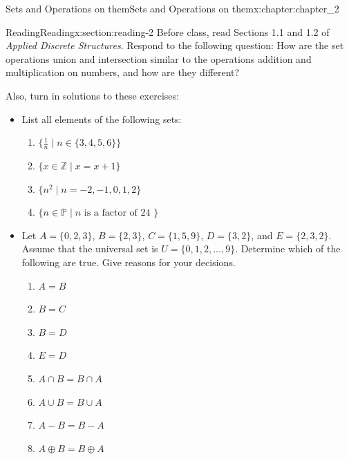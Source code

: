\documentclass[oneside,10pt,]{book}
\numberwithin{equation}{section}
\begin{document}
\typeout{************************************************}
%
\begin{chapterptx}{Sets and Operations on them}{}{Sets and Operations on them}{}{}{x:chapter:chapter_2}
%
%
%
\typeout{************************************************}
\typeout{************************************************}
%
\begin{sectionptx}{Reading}{}{Reading}{}{}{x:section:reading-2}
Before class, read Sections 1.1 and 1.2 of \emph{Applied Discrete Structures}.  Respond to the following question: How are the set operations union and intersection similar to the operations addition and multiplication on numbers, and how are they different?%
\par
Also, turn in solutions to these exercises:%
\begin{itemize}[label=\textbullet]
\item{}List all elements of the following sets:%
\begin{enumerate}[label=(\alph*)]
\item{}\(\{\frac{1}{n} \mid n \in \{3,4,5,6\}\}\)%
\item{}\(\{x \in \mathbb{Z} \mid x = x+1 \}\)%
\item{}\(\{n^2 \mid  n = -2, -1, 0, 1, 2\}\)%
\item{}\(\{n \in  \mathbb{P} \mid n \textrm{ is a  factor of  24 }\}\)%
\end{enumerate}
%
\item{}Let \(A = \{0, 2, 3\}\), \(B = \{2, 3\}\), \(C = \{1, 5, 9\}\), \(D = \{3, 2\}\), and \(E = \{2, 3, 2\}\). Assume that the universal set is \(U = \{0, 1, 2, . . . , 9\}\). Determine which of the following are true. Give reasons for your decisions.%
\begin{multicols}{2}
\begin{enumerate}[label=(\alph*)]
\item{}\(A = B\)%
\item{}\(B = C\)%
\item{}\(B = D\)%
\item{}\(E=D\)%
\item{}\(A\cap B = B\cap A\)%
\item{}\(A \cup  B = B \cup  A\)%
\item{}\(A-B = B-A\)%
\item{}\(A \oplus  B = B \oplus  A\)%
\end{enumerate}
\end{multicols}

\end{itemize}
\end{sectionptx}
\end{chapterptx}
\end{document}
